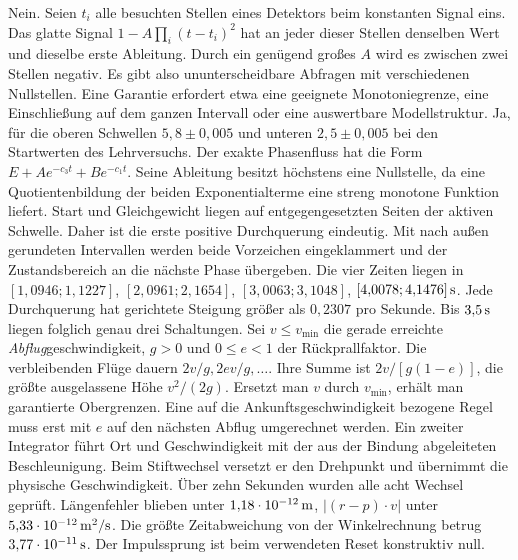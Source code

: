 Nein. Seien \(t_i\) alle besuchten Stellen eines Detektors beim konstanten Signal eins. Das glatte Signal \(1-A\prod_i(t-t_i)^2\) hat an jeder dieser Stellen denselben Wert und dieselbe erste Ableitung. Durch ein genügend großes \(A\) wird es zwischen zwei Stellen negativ. Es gibt also ununterscheidbare Abfragen mit verschiedenen Nullstellen. Eine Garantie erfordert etwa eine geeignete Monotoniegrenze, eine Einschließung auf dem ganzen Intervall oder eine auswertbare Modellstruktur.
Ja, für die oberen Schwellen \(5{,}8\pm0{,}005\) und unteren \(2{,}5\pm0{,}005\) bei den Startwerten des Lehrversuchs. Der exakte Phasenfluss hat die Form \(E+A e^{-c_3t}+B e^{-c_1t}\). Seine Ableitung besitzt höchstens eine Nullstelle, da eine Quotientenbildung der beiden Exponentialterme eine streng monotone Funktion liefert. Start und Gleichgewicht liegen auf entgegengesetzten Seiten der aktiven Schwelle. Daher ist die erste positive Durchquerung eindeutig.
Mit nach außen gerundeten Intervallen werden beide Vorzeichen eingeklammert und der Zustandsbereich an die nächste Phase übergeben. Die vier Zeiten liegen in \([1{,}0946;1{,}1227]\), \([2{,}0961;2{,}1654]\), \([3{,}0063;3{,}1048]\), \([4{,}0078;4{,}1476]\,\mathrm{s}\). Jede Durchquerung hat gerichtete Steigung größer als \(0{,}2307\) pro Sekunde. Bis \(3{,}5\,\mathrm{s}\) liegen folglich genau drei Schaltungen.
Sei \(v\le v_{\min}\) die gerade erreichte \emph{Abflug}geschwindigkeit, \(g>0\) und \(0\le e<1\) der Rückprallfaktor. Die verbleibenden Flüge dauern \(2v/g,2ev/g,\ldots\). Ihre Summe ist \(2v/[g(1-e)]\), die größte ausgelassene Höhe \(v^2/(2g)\). Ersetzt man \(v\) durch \(v_{\min}\), erhält man garantierte Obergrenzen. Eine auf die Ankunftsgeschwindigkeit bezogene Regel muss erst mit \(e\) auf den nächsten Abflug umgerechnet werden.
Ein zweiter Integrator führt Ort und Geschwindigkeit mit der aus der Bindung abgeleiteten Beschleunigung. Beim Stiftwechsel versetzt er den Drehpunkt und übernimmt die physische Geschwindigkeit. Über zehn Sekunden wurden alle acht Wechsel geprüft. Längenfehler blieben unter \(1{,}18\cdot10^{-12}\,\mathrm{m}\), \(|(r-p)\cdot v|\) unter \(5{,}33\cdot10^{-12}\,\mathrm{m^2/s}\). Die größte Zeitabweichung von der Winkelrechnung betrug \(3{,}77\cdot10^{-11}\,\mathrm{s}\). Der Impulssprung ist beim verwendeten Reset konstruktiv null.

